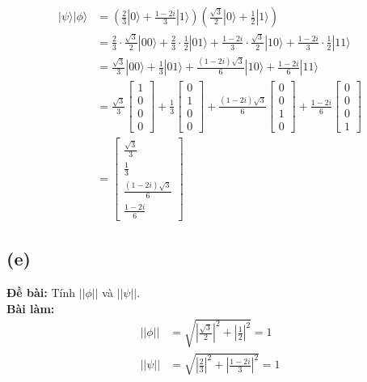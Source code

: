 \begin{align*}
    |\psi\rangle|\phi\rangle &= \left(\frac{2}{3}|0\rangle+\frac{1-2i}{3}|1\rangle\right)\left(\frac{\sqrt{3}}{2}|0\rangle+\frac{1}{2}|1\rangle\right)\\
    &= \frac{2}{3}\cdot\frac{\sqrt{3}}{2}|00\rangle + \frac{2}{3}\cdot\frac{1}{2}|01\rangle + \frac{1-2i}{3}\cdot\frac{\sqrt{3}}{2}|10\rangle + \frac{1-2i}{3}\cdot\frac{1}{2}|11\rangle\\
    &= \frac{\sqrt{3}}{3}|00\rangle + \frac{1}{3}|01\rangle + \frac{(1-2i)\sqrt{3}}{6}|10\rangle + \frac{1-2i}{6}|11\rangle\\
    &= \frac{\sqrt{3}}{3} \begin{bmatrix}
        1 \\
        0 \\
        0 \\
        0
    \end{bmatrix}
    + \frac{1}{3} \begin{bmatrix}
        0 \\
        1 \\
        0 \\
        0
    \end{bmatrix}
    + \frac{(1-2i)\sqrt{3}}{6} \begin{bmatrix}
        0 \\
        0 \\
        1 \\
        0
    \end{bmatrix}
    + \frac{1-2i}{6} \begin{bmatrix}
        0 \\
        0 \\
        0 \\
        1
    \end{bmatrix}\\
    &= \begin{bmatrix}
        \frac{\sqrt{3}}{3} \\
        \frac{1}{3} \\
        \frac{(1-2i)\sqrt{3}}{6} \\
        \frac{1-2i}{6}
    \end{bmatrix}
\end{align*}

\subsection{(e)}
\textbf{Đề bài:} Tính $||\phi||$ và $||\psi||$.\\
\textbf{Bài làm:}
\begin{align*}
    ||\phi|| &= \sqrt{\left|\frac{\sqrt{3}}{2}\right|^2 + \left|\frac{1}{2}\right|^2} = 1\\
    ||\psi|| &= \sqrt{\left|\frac{2}{3}\right|^2 + \left|\frac{1-2i}{3}\right|^2} = 1\\
\end{align*}

